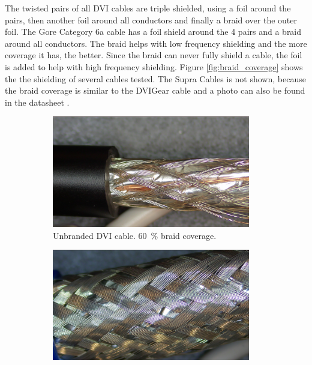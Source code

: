 The twisted pairs of all DVI cables are triple shielded, using a foil around the pairs, then another foil around all conductors and finally a braid over the outer foil. The Gore Category 6a cable has a foil shield around the 4 pairs and a braid around all conductors. The braid helps with low frequency shielding and the more coverage it has, the better. Since the braid can never fully shield a cable, the foil is added to help with high frequency shielding. Figure \ref{fig:braid_coverage} shows the the shielding of several cables tested. The Supra Cables  is not shown, because the braid coverage is similar to the DVIGear cable and a photo can also be found in the datasheet \cite{supra_dvi_cable}.
\begin{figure}[ht]
    \centering
    \begin{subfigure}[t]{0.45\linewidth}
        \centering
        \includegraphics[width=0.95\textwidth]{images/braid_coverage/14-39-55.jpg}
        \caption{Unbranded DVI cable. \qty{60}{\percent} braid coverage.}
        \label{fig:braid_coverage_unknown}
    \end{subfigure}
    \begin{subfigure}[t]{0.45\linewidth}
        \centering
        \includegraphics[width=0.95\textwidth]{images/braid_coverage/14-37-27.jpg}

\end{subfigure}
\end{figure}
